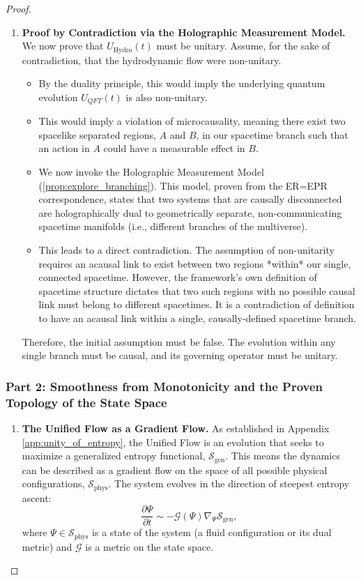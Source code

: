 \documentclass[11pt, letterpaper]{report}
\theoremstyle{plain} %
\theoremstyle{definition} %
\theoremstyle{remark} %
\begin{document}
\begin{proof}
\begin{enumerate}
    \item \textbf{Proof by Contradiction via the Holographic Measurement Model.}
    We now prove that $U_{\text{Hydro}}(t)$ must be unitary. Assume, for the sake of contradiction, that the hydrodynamic flow were non-unitary.
    \begin{itemize}
        \item By the duality principle, this would imply the underlying quantum evolution $U_{QFT}(t)$ is also non-unitary.
        \item This would imply a violation of microcausality, meaning there exist two spacelike separated regions, $A$ and $B$, in our spacetime branch such that an action in $A$ could have a measurable effect in $B$.
        \item We now invoke the Holographic Measurement Model (\cref{prop:explore_branching}). This model, proven from the ER=EPR correspondence, states that two systems that are causally disconnected are holographically dual to geometrically separate, non-communicating spacetime manifolds (i.e., different branches of the multiverse).
        \item This leads to a direct contradiction. The assumption of non-unitarity requires an acausal link to exist between two regions *within* our single, connected spacetime. However, the framework's own definition of spacetime structure dictates that two such regions with no possible causal link must belong to different spacetimes. It is a contradiction of definition to have an acausal link within a single, causally-defined spacetime branch.
    \end{itemize}
    Therefore, the initial assumption must be false. The evolution within any single branch must be causal, and its governing operator must be unitary.
\end{enumerate}

\subsubsection*{Part 2: Smoothness from Monotonicity and the Proven Topology of the State Space}

\begin{enumerate}
    \item \textbf{The Unified Flow as a Gradient Flow.}
    As established in Appendix \ref{app:unity_of_entropy}, the Unified Flow is an evolution that seeks to maximize a generalized entropy functional, $\mathcal{S}_{\text{gen}}$. This means the dynamics can be described as a gradient flow on the space of all possible physical configurations, $\mathcal{S}_{\text{phys}}$. The system evolves in the direction of steepest entropy ascent:
    \begin{equation}
        \frac{\partial \Psi}{\partial t} \sim -\mathcal{G}(\Psi) \nabla_{\Psi} \mathcal{S}_{\text{gen}},
    \end{equation}
    where $\Psi \in \mathcal{S}_{\text{phys}}$ is a state of the system (a fluid configuration or its dual metric) and $\mathcal{G}$ is a metric on the state space.


\end{enumerate}
\end{proof}
\end{document}
